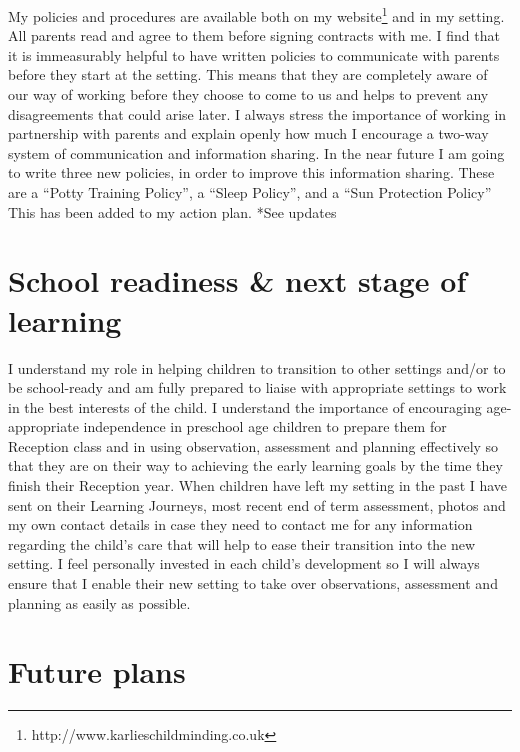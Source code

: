 \documentclass[10pt,a4paper]{report}
\begin{document}
My policies and procedures are available both on my website\footnote{http://www.karlieschildminding.co.uk} and in my setting. All parents read and agree to them before signing contracts with me. I find that it is immeasurably helpful to have written policies to communicate with parents before they start at the setting. This means that they are completely aware of our way of working before they choose to come to us and helps to prevent any disagreements that could arise later. I always stress the importance of working in partnership with parents and explain openly how much I encourage a two-way system of communication and information sharing. In the near future I am going to write three new policies, in order to improve this information sharing. These are a “Potty Training Policy”, a “Sleep Policy”, and a “Sun Protection Policy” This has been added to my action plan. *See updates

\section{School readiness \& next stage of learning}

I understand my role in helping children to transition to other settings and/or to be school-ready and am fully prepared to liaise with appropriate settings to work in the best interests of the child. I understand the importance of encouraging age-appropriate independence in preschool age children to prepare them for Reception class and in using observation, assessment and planning effectively so that they are on their way to achieving the early learning goals by the time they finish their Reception year. When children have left my setting in the past I have sent on their Learning Journeys, most recent end of term assessment, photos and my own contact details in case they need to contact me for any information regarding the child's care that will help to ease their transition into the new setting. I feel personally invested in each child's development so I will always ensure that I enable their new setting to take over observations, assessment and planning as easily as possible.

\section{Future plans}
\end{document}
